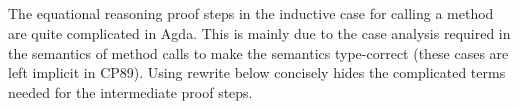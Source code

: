 \begin{AgdaAlign}
\begin{code}
\AgdaSpace{}%
\AgdaSymbol{=}\<%
\\
\>[4][@{}l@{\AgdaIndent{0}}]%
\>[6]%
\>[13]\AgdaSpace{}%
\AgdaSymbol{(}\AgdaSpace{}%
\AgdaSymbol{)}\AgdaSpace{}%
\AgdaSpace{}%
\AgdaSpace{}%
\AgdaSpace{}%
\AgdaSpace{}%
\AgdaSymbol{(}\AgdaSpace{}%
\AgdaSpace{}%
\AgdaSymbol{)}\<%
\\
%
\>[6]%
\>[13]\AgdaSymbol{(}\AgdaSpace{}%
\AgdaSpace{}%
\AgdaSpace{}%
\AgdaSpace{}%
\AgdaSpace{}%
\AgdaSpace{}%
\AgdaSymbol{)}\<%
\\
%
\>[6]%
\>[13]\AgdaSpace{}%
\AgdaSpace{}%
\AgdaSpace{}%
\AgdaSymbol{(}\AgdaSpace{}%
\AgdaSpace{}%
\AgdaSymbol{)}\AgdaSpace{}%
\AgdaSymbol{(}\AgdaSpace{}%
\AgdaSymbol{(}\AgdaSpace{}%
\AgdaSymbol{)}\AgdaSpace{}%
\AgdaSpace{}%
\AgdaSymbol{)}\<%
\\
%
\>[6]\<%
\end{code}
%
The equational reasoning proof steps in the inductive case for calling a method
are quite complicated in Agda.
This is mainly due to the case analysis required in the semantics of method calls
to make the semantics type-correct
(these cases are left implicit in CP89).
Using rewrite below concisely hides the complicated terms needed for the intermediate proof steps.
%
\begin{code}%
%
\>[4]\AgdaSpace{}%
\AgdaSpace{}%
\AgdaSymbol{(}\AgdaSpace{}%
\AgdaSpace{}%
\AgdaSpace{}%
\AgdaSymbol{)}\AgdaSpace{}%
\AgdaSpace{}%
\AgdaSpace{}%
\AgdaSpace{}%
\AgdaSpace{}%
\AgdaSymbol{(}\AgdaSpace{}%
\AgdaSpace{}%
\AgdaSpace{}%
\AgdaSpace{}%
\AgdaSpace{}%
\AgdaSymbol{)}\AgdaSpace{}%
\AgdaSpace{}%
\AgdaSymbol{(}\AgdaSpace{}%
\AgdaSpace{}%

\end{code}
\end{AgdaAlign}
